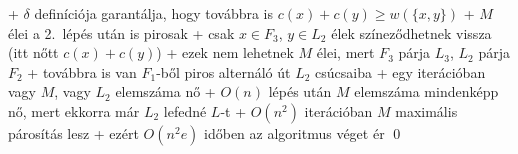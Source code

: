     + $\delta$ definíciója garantálja, hogy továbbra is $c(x) + c(y)
      \ge w(\{x, y\})$
  + $M$ élei a 2.~lépés után is pirosak
    + csak $x \in F_3$, $y \in L_2$ élek színeződhetnek vissza (itt nőtt
      $c(x) + c(y)$)
    + ezek nem lehetnek $M$ élei, mert $F_3$ párja $L_3$, $L_2$ párja
    $F_2$
    + továbbra is van $F_1$-ből piros alternáló út $L_2$ csúcsaiba
  + egy iterációban vagy $M$, vagy $L_2$ elemszáma nő
   + $O(n)$ lépés után $M$ elemszáma mindenképp nő, mert ekkorra már $L_2$
     lefedné $L$-t
   + $O(n^2)$ iterációban $M$ maximális párosítás lesz
   + ezért $O(n^2 e)$ időben az algoritmus véget ér \qed


